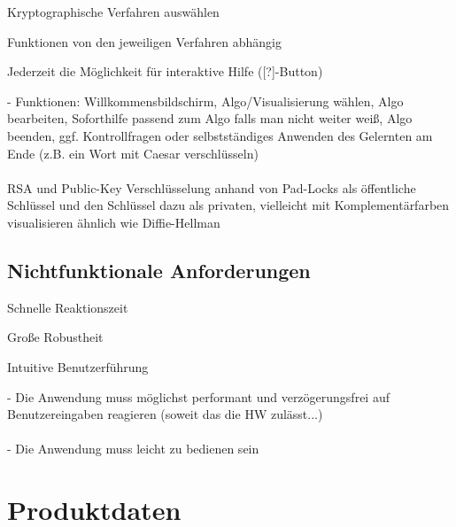 \documentclass{article}
\begin{document}
\begin{FA}[start=200]
\item Kryptographische Verfahren auswählen
\end{FA}

\begin{FA}[start=300]
\item Funktionen von den jeweiligen Verfahren abhängig
\end{FA}

\begin{FA}[start=400]
\item Jederzeit die Möglichkeit für interaktive Hilfe ([?]-Button)
\end{FA}

- Funktionen: Willkommensbildschirm, Algo/Visualisierung wählen, Algo bearbeiten, 
Soforthilfe passend zum Algo falls man nicht weiter weiß, Algo beenden, 
ggf. Kontrollfragen oder selbstständiges Anwenden des Gelernten am Ende (z.B. ein Wort mit Caesar verschlüsseln)
\\
\\
RSA und Public-Key Verschlüsselung anhand von Pad-Locks als 
öffentliche Schlüssel und den Schlüssel  dazu als privaten,
vielleicht mit Komplementärfarben visualisieren ähnlich wie Diffie-Hellman

\subsection{Nichtfunktionale Anforderungen}

\begin{NA}[start=100]
\item Schnelle Reaktionszeit
\end{NA}
\begin{NA}[start=200]
\item Große Robustheit
\end{NA}
\begin{NA}[start=300]
\item Intuitive Benutzerführung
\end{NA}

- Die Anwendung muss möglichst performant und verzögerungsfrei auf Benutzereingaben reagieren (soweit das die HW zulässt...)
\\
\\
- Die Anwendung muss leicht zu bedienen sein

\section{Produktdaten}
\end{document}
